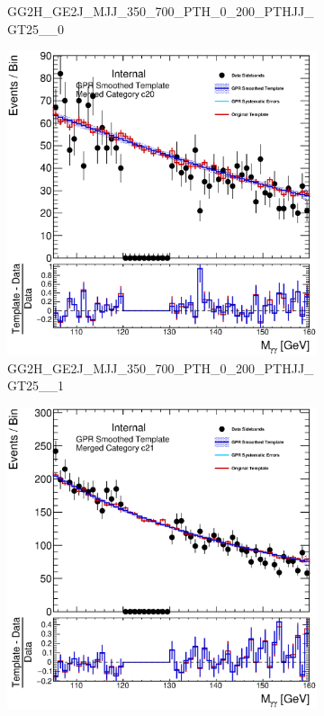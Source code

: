 \begin{figure}
\begin{center}
\begin{subfigure}[T]{0.49\linewidth}
	\caption{\tiny{GG2H\_GE2J\_MJJ\_350\_700\_PTH\_0\_200\_PTHJJ\_GT25\_\_0}}
\end{subfigure}
\begin{subfigure}[T]{0.49\linewidth}
	\centering
	\includegraphics[width=\linewidth]{figures/background/gpr/coupCatTemplates/GPR_Smoothed_Plot_hmgg_c20.eps}
	\caption{\tiny{GG2H\_GE2J\_MJJ\_350\_700\_PTH\_0\_200\_PTHJJ\_GT25\_\_1}}
\end{subfigure}
\begin{subfigure}[T]{0.49\linewidth}
	\centering
	\includegraphics[width=\linewidth]{figures/background/gpr/coupCatTemplates/GPR_Smoothed_Plot_hmgg_c21.eps}

\end{subfigure}
\end{center}
\end{figure}
